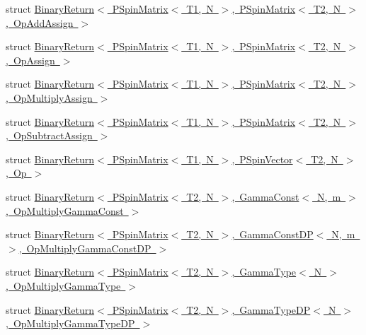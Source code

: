 \begin{DoxyCompactItemize}
\item 
struct \mbox{\hyperlink{structENSEM_1_1BinaryReturn_3_01PSpinMatrix_3_01T1_00_01N_01_4_00_01PSpinMatrix_3_01T2_00_01N_01_4_00_01OpAddAssign_01_4}{Binary\+Return$<$ P\+Spin\+Matrix$<$ T1, N $>$, P\+Spin\+Matrix$<$ T2, N $>$, Op\+Add\+Assign $>$}}
\item 
struct \mbox{\hyperlink{structENSEM_1_1BinaryReturn_3_01PSpinMatrix_3_01T1_00_01N_01_4_00_01PSpinMatrix_3_01T2_00_01N_01_4_00_01OpAssign_01_4}{Binary\+Return$<$ P\+Spin\+Matrix$<$ T1, N $>$, P\+Spin\+Matrix$<$ T2, N $>$, Op\+Assign $>$}}
\item 
struct \mbox{\hyperlink{structENSEM_1_1BinaryReturn_3_01PSpinMatrix_3_01T1_00_01N_01_4_00_01PSpinMatrix_3_01T2_00_01N_01_4_00_01OpMultiplyAssign_01_4}{Binary\+Return$<$ P\+Spin\+Matrix$<$ T1, N $>$, P\+Spin\+Matrix$<$ T2, N $>$, Op\+Multiply\+Assign $>$}}
\item 
struct \mbox{\hyperlink{structENSEM_1_1BinaryReturn_3_01PSpinMatrix_3_01T1_00_01N_01_4_00_01PSpinMatrix_3_01T2_00_01N_01_4_00_01OpSubtractAssign_01_4}{Binary\+Return$<$ P\+Spin\+Matrix$<$ T1, N $>$, P\+Spin\+Matrix$<$ T2, N $>$, Op\+Subtract\+Assign $>$}}
\item 
struct \mbox{\hyperlink{structENSEM_1_1BinaryReturn_3_01PSpinMatrix_3_01T1_00_01N_01_4_00_01PSpinVector_3_01T2_00_01N_01_4_00_01Op_01_4}{Binary\+Return$<$ P\+Spin\+Matrix$<$ T1, N $>$, P\+Spin\+Vector$<$ T2, N $>$, Op $>$}}
\item 
struct \mbox{\hyperlink{structENSEM_1_1BinaryReturn_3_01PSpinMatrix_3_01T2_00_01N_01_4_00_01GammaConst_3_01N_00_01m_01_4_00_01OpMultiplyGammaConst_01_4}{Binary\+Return$<$ P\+Spin\+Matrix$<$ T2, N $>$, Gamma\+Const$<$ N, m $>$, Op\+Multiply\+Gamma\+Const $>$}}
\item 
struct \mbox{\hyperlink{structENSEM_1_1BinaryReturn_3_01PSpinMatrix_3_01T2_00_01N_01_4_00_01GammaConstDP_3_01N_00_01m_01fc91b4deeb7eab4452a6a4224b8c6fde}{Binary\+Return$<$ P\+Spin\+Matrix$<$ T2, N $>$, Gamma\+Const\+D\+P$<$ N, m $>$, Op\+Multiply\+Gamma\+Const\+D\+P $>$}}
\item 
struct \mbox{\hyperlink{structENSEM_1_1BinaryReturn_3_01PSpinMatrix_3_01T2_00_01N_01_4_00_01GammaType_3_01N_01_4_00_01OpMultiplyGammaType_01_4}{Binary\+Return$<$ P\+Spin\+Matrix$<$ T2, N $>$, Gamma\+Type$<$ N $>$, Op\+Multiply\+Gamma\+Type $>$}}
\item 
struct \mbox{\hyperlink{structENSEM_1_1BinaryReturn_3_01PSpinMatrix_3_01T2_00_01N_01_4_00_01GammaTypeDP_3_01N_01_4_00_01OpMultiplyGammaTypeDP_01_4}{Binary\+Return$<$ P\+Spin\+Matrix$<$ T2, N $>$, Gamma\+Type\+D\+P$<$ N $>$, Op\+Multiply\+Gamma\+Type\+D\+P $>$}}

\end{DoxyCompactItemize}
